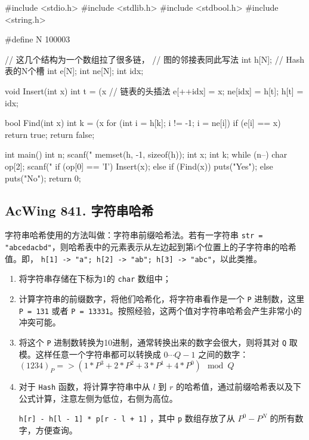 \begin{mycpptwocol}[拉链法]
    #include <stdio.h>
    #include <stdlib.h>
    #include <stdbool.h>
    #include <string.h>

    #define N 100003

    // 这几个结构为一个数组拉了很多链，
    // 图的邻接表同此写法
    int h[N]; // Hash表的N个槽
    int e[N];
    int ne[N];
    int idx;

    void Insert(int x) {
        int t = (x %
        // 链表的头插法
        e[++idx] = x;
        ne[idx] = h[t];
        h[t] = idx;
    }

    bool Find(int x) {
        int k = (x %
        for (int i = h[k]; i != -1; i = ne[i]) {
            if (e[i] == x) {
                return true;
            }
        }
        return false;
    }

    int main() {
        int n;
        scanf("%
        memset(h, -1, sizeof(h));
        int x;
        int k;
        while (n--) {
            char op[2];
            scanf("%
            if (op[0] == 'I') {
                Insert(x);
            } else {
                if (Find(x)) {
                    puts("Yes");
                } else {
                    puts("No");
                }
            }
        }
        return 0;
    }
\end{mycpptwocol}

\subsection{AcWing 841. 字符串哈希}

字符串哈希使用的方法叫做：字符串前缀哈希法。若有一字符串 \lstinline{str = "abcedacbd"}，则哈希表中的元素表示从左边起到第i个位置上的子字符串的哈希值。即， \lstinline{h[1] -> "a"; h[2] -> "ab"; h[3] -> "abc"}，以此类推。

\begin{enumerate}
    \item 将字符串存储在下标为1的 \lstinline{char} 数组中；
    \item 计算字符串的前缀数字，将他们哈希化，将字符串看作是一个 \lstinline{P} 进制数，这里 \lstinline{P = 131} 或者 \lstinline{P = 13331}。按照经验，这两个值对字符串哈希会产生非常小的冲突可能。
    \item 将这个 \lstinline{P} 进制数转换为10进制，通常转换出来的数字会很大，则将其对 \lstinline{Q} 取模。这样任意一个字符串都可以转换成 $0 \cdots Q - 1$ 之间的数字：$(1234)_P => (1 * P^3 + 2 * P^2 + 3 * P^1 + 4 * P^0) \mod Q$
    \item 对于 \lstinline{Hash} 函数，将计算字符串中从 $l$ 到 $r$ 的哈希值，通过前缀哈希表以及下公式计算，注意左侧为低位，右侧为高位。

    \lstinline{h[r] - h[l - 1] * p[r - l + 1]} ，其中 \lstinline{p} 数组存放了从 $P^0 - P^N$ 的所有数字，方便查询。
\end{enumerate}

